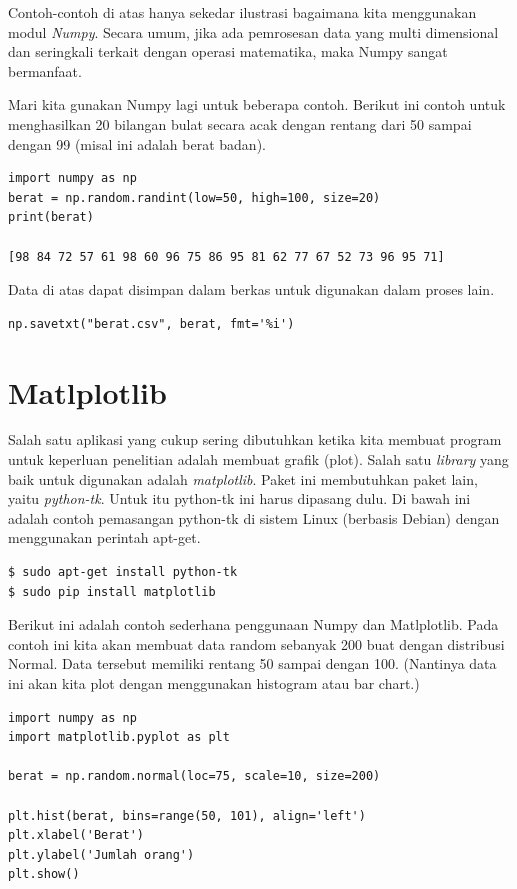 Contoh-contoh di atas hanya sekedar ilustrasi bagaimana kita menggunakan
modul {\em Numpy}. Secara umum, jika ada pemrosesan data yang multi dimensional
dan seringkali terkait dengan operasi matematika, maka Numpy
sangat bermanfaat.

Mari kita gunakan Numpy lagi untuk beberapa contoh.
Berikut ini contoh untuk menghasilkan 20 bilangan bulat secara acak
dengan rentang dari 50 sampai dengan 99 (misal ini adalah berat badan).

\begin{verbatim}
import numpy as np
berat = np.random.randint(low=50, high=100, size=20)
print(berat)

[98 84 72 57 61 98 60 96 75 86 95 81 62 77 67 52 73 96 95 71]
\end{verbatim}

Data di atas dapat disimpan dalam berkas untuk digunakan dalam
proses lain.
\begin{verbatim}
np.savetxt("berat.csv", berat, fmt='%i')
\end{verbatim}


\section{Matlplotlib}
Salah satu aplikasi yang cukup sering dibutuhkan ketika kita membuat program 
untuk keperluan penelitian adalah membuat grafik (plot). 
Salah satu {\em library} yang baik untuk digunakan adalah {\em matplotlib}. 
Paket ini membutuhkan paket lain, yaitu {\em python-tk}. 
Untuk itu python-tk ini harus dipasang dulu. 
Di bawah ini adalah contoh pemasangan python-tk di sistem Linux (berbasis Debian) 
dengan menggunakan perintah apt-get.

\begin{verbatim}
$ sudo apt-get install python-tk
$ sudo pip install matplotlib
\end{verbatim}

Berikut ini adalah contoh sederhana penggunaan Numpy dan Matlplotlib.
Pada contoh ini kita akan membuat data random sebanyak 200 buat
dengan distribusi Normal. Data tersebut memiliki rentang 50 sampai dengan 100.
(Nantinya data ini akan kita plot dengan menggunakan histogram atau bar chart.)

\begin{verbatim}
import numpy as np
import matplotlib.pyplot as plt

berat = np.random.normal(loc=75, scale=10, size=200)

plt.hist(berat, bins=range(50, 101), align='left')
plt.xlabel('Berat')
plt.ylabel('Jumlah orang')
plt.show()
\end{verbatim}

